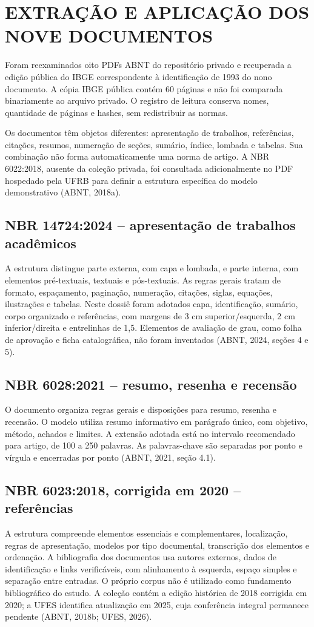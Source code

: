 \section{EXTRAÇÃO E APLICAÇÃO DOS NOVE DOCUMENTOS}
Foram reexaminados oito PDFs ABNT do repositório privado e recuperada a edição pública do IBGE correspondente à identificação de 1993 do nono documento. A cópia IBGE pública contém 60 páginas e não foi comparada binariamente ao arquivo privado. O registro de leitura conserva nomes, quantidade de páginas e hashes, sem redistribuir as normas.

Os documentos têm objetos diferentes: apresentação de trabalhos, referências, citações, resumos, numeração de seções, sumário, índice, lombada e tabelas. Sua combinação não forma automaticamente uma norma de artigo. A NBR 6022:2018, ausente da coleção privada, foi consultada adicionalmente no PDF hospedado pela UFRB para definir a estrutura específica do modelo demonstrativo (ABNT, 2018a).

\subsection{NBR 14724:2024 -- apresentação de trabalhos acadêmicos}
A estrutura distingue parte externa, com capa e lombada, e parte interna, com elementos pré-textuais, textuais e pós-textuais. As regras gerais tratam de formato, espaçamento, paginação, numeração, citações, siglas, equações, ilustrações e tabelas. Neste dossiê foram adotados capa, identificação, sumário, corpo organizado e referências, com margens de 3 cm superior/esquerda, 2 cm inferior/direita e entrelinhas de 1,5. Elementos de avaliação de grau, como folha de aprovação e ficha catalográfica, não foram inventados (ABNT, 2024, seções 4 e 5).

\subsection{NBR 6028:2021 -- resumo, resenha e recensão}
O documento organiza regras gerais e disposições para resumo, resenha e recensão. O modelo utiliza resumo informativo em parágrafo único, com objetivo, método, achados e limites. A extensão adotada está no intervalo recomendado para artigo, de 100 a 250 palavras. As palavras-chave são separadas por ponto e vírgula e encerradas por ponto (ABNT, 2021, seção 4.1).

\subsection{NBR 6023:2018, corrigida em 2020 -- referências}
A estrutura compreende elementos essenciais e complementares, localização, regras de apresentação, modelos por tipo documental, transcrição dos elementos e ordenação. A bibliografia dos documentos usa autores externos, dados de identificação e links verificáveis, com alinhamento à esquerda, espaço simples e separação entre entradas. O próprio corpus não é utilizado como fundamento bibliográfico do estudo. A coleção contém a edição histórica de 2018 corrigida em 2020; a UFES identifica atualização em 2025, cuja conferência integral permanece pendente (ABNT, 2018b; UFES, 2026).

